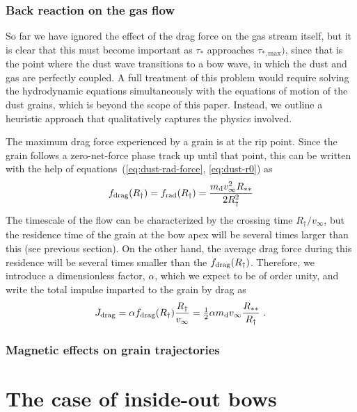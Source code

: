 \subsubsection{Back reaction on the gas flow}
\label{sec:back-reaction-gas}

So far we have ignored the effect of the drag force on the gas stream
itself, but it is clear that this must become important as \(\tau_*\)
approaches \(\tau_{*,\text{max}})\), since that is the point where the
dust wave transitions to a bow wave, in which the dust and gas are
perfectly coupled.  A full treatment of this problem would require
solving the hydrodynamic equations simultaneously with the equations
of motion of the dust grains, which is beyond the scope of this paper.
Instead, we outline a heuristic approach that qualitatively captures
the physics involved.

The maximum drag force experienced by a grain is at the rip point.
Since the grain follows a zero-net-force phase track up until that
point, this can be written with the help of
equations~(\ref{eq:dust-rad-force}, \ref{eq:dust-r0}) as
\begin{equation}
  \label{eq:fdrag-max}
  f_{\text{drag}} (R_\dag) = f_{\text{rad}}(R_\dag) =   \frac{m_{\text{d}} v_\infty^2 R_{**}}{ 2 R_\dag^2} 
\end{equation}
The timescale of the flow can be characterized by the crossing time
\(R_\dag / v_\infty\), but the residence time of the grain at the bow apex
will be several times larger than this (see previous section).  On the
other hand, the average drag force during this residence will be
several times smaller than the \(f_{\text{drag}} (R_\dag)\).  Therefore, we introduce a dimensionless factor, \(\alpha\), which we expect to be of order unity, and write the total impulse imparted to the grain by drag as
\begin{equation}
  \label{eq:grain-impulse}
  J\drag = \alpha f\drag (R_\dag) \frac{R_\dag}{v_\infty}
  = \tfrac12 \alpha m\grain v_\infty \frac{R\starstar}{R_\dag} \ .
\end{equation}



\subsubsection{Magnetic effects on grain trajectories }
\label{sec:magn-effects-grain}



\section{The case of inside-out bows}
\label{sec:case-inside-out}

